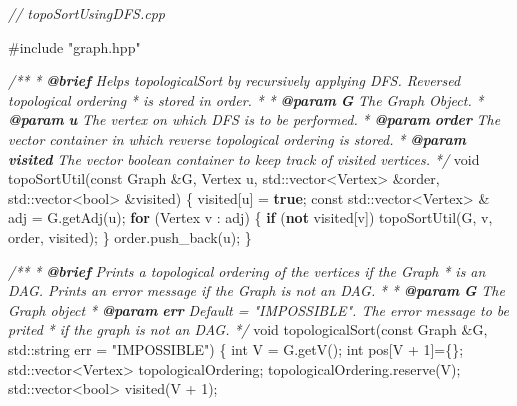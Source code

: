 \documentclass[
]{article}
\newenvironment{Shaded}{}{}
\newcommand{\AnnotationTok}[1]{\textcolor[rgb]{0.38,0.63,0.69}{\textbf{\textit{#1}}}}
\newcommand{\AttributeTok}[1]{\textcolor[rgb]{0.49,0.56,0.16}{#1}}
\newcommand{\BuiltInTok}[1]{#1}
\newcommand{\CommentTok}[1]{\textcolor[rgb]{0.38,0.63,0.69}{\textit{#1}}}
\newcommand{\CommentVarTok}[1]{\textcolor[rgb]{0.38,0.63,0.69}{\textbf{\textit{#1}}}}
\newcommand{\ControlFlowTok}[1]{\textcolor[rgb]{0.00,0.44,0.13}{\textbf{#1}}}
\newcommand{\DataTypeTok}[1]{\textcolor[rgb]{0.56,0.13,0.00}{#1}}
\newcommand{\DecValTok}[1]{\textcolor[rgb]{0.25,0.63,0.44}{#1}}
\newcommand{\ImportTok}[1]{#1}
\newcommand{\KeywordTok}[1]{\textcolor[rgb]{0.00,0.44,0.13}{\textbf{#1}}}
\newcommand{\NormalTok}[1]{#1}
\newcommand{\PreprocessorTok}[1]{\textcolor[rgb]{0.74,0.48,0.00}{#1}}
\newcommand{\StringTok}[1]{\textcolor[rgb]{0.25,0.44,0.63}{#1}}
\begin{document}
\begin{Shaded}
\begin{Highlighting}[]
\CommentTok{// topoSortUsingDFS.cpp}

\PreprocessorTok{\#include }\ImportTok{"graph.hpp"}

\CommentTok{/**}
\CommentTok{ * }\AnnotationTok{@brief}\CommentTok{ Helps topologicalSort by recursively applying DFS. Reversed topological ordering }
\CommentTok{ * is stored in order.}
\CommentTok{ *}
\CommentTok{ * }\AnnotationTok{@param}\CommentTok{ }\CommentVarTok{G}\CommentTok{ The Graph Object.}
\CommentTok{ * }\AnnotationTok{@param}\CommentTok{ }\CommentVarTok{u}\CommentTok{ The vertex on which DFS is to be performed.}
\CommentTok{ * }\AnnotationTok{@param}\CommentTok{ }\CommentVarTok{order}\CommentTok{ The vector container in which reverse topological ordering is stored.}
\CommentTok{ * }\AnnotationTok{@param}\CommentTok{ }\CommentVarTok{visited}\CommentTok{ The vector boolean container to keep track of visited vertices.}
\CommentTok{ */}
\DataTypeTok{void} 
\NormalTok{topoSortUtil(}\AttributeTok{const}\NormalTok{ Graph \&G, Vertex u, }\BuiltInTok{std::}\NormalTok{vector\textless{}Vertex\textgreater{} \&order, }\BuiltInTok{std::}\NormalTok{vector\textless{}}\DataTypeTok{bool}\NormalTok{\textgreater{} \&visited) \{}
\NormalTok{    visited[u] = }\KeywordTok{true}\NormalTok{;}
    \AttributeTok{const} \BuiltInTok{std::}\NormalTok{vector\textless{}Vertex\textgreater{} \& adj = G.getAdj(u);}
    \ControlFlowTok{for}\NormalTok{ (Vertex v : adj) \{}
        \ControlFlowTok{if}\NormalTok{ (}\KeywordTok{not}\NormalTok{ visited[v]) }
\NormalTok{            topoSortUtil(G, v, order, visited);}
\NormalTok{    \}}
\NormalTok{    order.push\_back(u);}
\NormalTok{\}}


\CommentTok{/**}
\CommentTok{ * }\AnnotationTok{@brief}\CommentTok{ Prints a topological ordering of the vertices if the Graph }
\CommentTok{ * is an DAG. Prints an error message if the Graph is not an DAG.}
\CommentTok{ * }
\CommentTok{ * }\AnnotationTok{@param}\CommentTok{ }\CommentVarTok{G}\CommentTok{ The Graph object}
\CommentTok{ * }\AnnotationTok{@param}\CommentTok{ }\CommentVarTok{err}\CommentTok{ Default = "IMPOSSIBLE". The error message to be prited}
\CommentTok{ * if the graph is not an DAG.}
\CommentTok{ */}
\DataTypeTok{void} 
\NormalTok{topologicalSort(}\AttributeTok{const}\NormalTok{ Graph \&G, }\BuiltInTok{std::}\NormalTok{string err = }\StringTok{"IMPOSSIBLE"}\NormalTok{) \{}
    \DataTypeTok{int}\NormalTok{ V = G.getV();}
    \DataTypeTok{int}\NormalTok{ pos[V + }\DecValTok{1}\NormalTok{]=\{\};}
    \BuiltInTok{std::}\NormalTok{vector\textless{}Vertex\textgreater{} topologicalOrdering;}
\NormalTok{    topologicalOrdering.reserve(V);}
    \BuiltInTok{std::}\NormalTok{vector\textless{}}\DataTypeTok{bool}\NormalTok{\textgreater{} visited(V + }\DecValTok{1}\NormalTok{);}


\end{Highlighting}
\end{Shaded}
\end{document}

